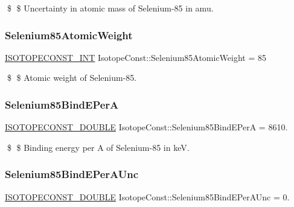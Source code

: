 \$ \$ Uncertainty in atomic mass of Selenium-\/85 in amu. \mbox{\label{group___isotope_const-_selenium-_se85_ga77cf1910e8355566d8dc8bb8fa1f64bc}} 
\subsubsection{\texorpdfstring{Selenium85\+Atomic\+Weight}{Selenium85AtomicWeight}}
{\footnotesize\ttfamily \mbox{\hyperlink{group___isotope_const-_macros_ga5f18360b3e99483a35c32d789e62621c}{I\+S\+O\+T\+O\+P\+E\+C\+O\+N\+S\+T\+\_\+\+I\+NT}} Isotope\+Const\+::\+Selenium85\+Atomic\+Weight = 85}

\$ \$ Atomic weight of Selenium-\/85. \mbox{\label{group___isotope_const-_selenium-_se85_ga7569c9cee9b1fc11e0c02c065bbafd28}} 
\subsubsection{\texorpdfstring{Selenium85\+Bind\+E\+PerA}{Selenium85BindEPerA}}
{\footnotesize\ttfamily \mbox{\hyperlink{group___isotope_const-_macros_ga8f45a7272ce02c0b4c65c44636ed719a}{I\+S\+O\+T\+O\+P\+E\+C\+O\+N\+S\+T\+\_\+\+D\+O\+U\+B\+LE}} Isotope\+Const\+::\+Selenium85\+Bind\+E\+PerA = 8610.}

\$ \$ Binding energy per A of Selenium-\/85 in keV. \mbox{\label{group___isotope_const-_selenium-_se85_ga06e1f37c6882914a34b9bf7a838298e8}} 
\subsubsection{\texorpdfstring{Selenium85\+Bind\+E\+Per\+A\+Unc}{Selenium85BindEPerAUnc}}
{\footnotesize\ttfamily \mbox{\hyperlink{group___isotope_const-_macros_ga8f45a7272ce02c0b4c65c44636ed719a}{I\+S\+O\+T\+O\+P\+E\+C\+O\+N\+S\+T\+\_\+\+D\+O\+U\+B\+LE}} Isotope\+Const\+::\+Selenium85\+Bind\+E\+Per\+A\+Unc = 0.}

